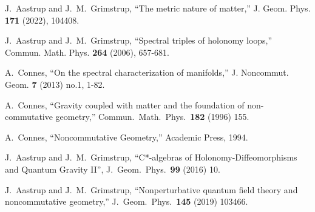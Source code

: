 \documentclass[letterpaper,12pt]{article}
\begin{document}
\begin{thebibliography}{99}




J.~Aastrup and J.~M.~Grimstrup,
``The metric nature of matter,''
J. Geom. Phys. \textbf{171} (2022), 104408.


J.~Aastrup and J.~M.~Grimstrup,
``Spectral triples of holonomy loops,''
Commun. Math. Phys. \textbf{264} (2006), 657-681.




A.~Connes,
``On the spectral characterization of manifolds,''
J. Noncommut. Geom. \textbf{7} (2013) no.1, 1-82.




A.~Connes,
``Gravity coupled with matter and the foundation of non-commutative
geometry,''
Commun.\ Math.\ Phys.\  {\bf 182} (1996) 155.





A.~Connes,
``Noncommutative Geometry,'' Academic Press, 1994.







  J.~Aastrup and J.~M.~Grimstrup,
  ``C*-algebras of Holonomy-Diffeomorphisms and Quantum Gravity II'',
   J.\ Geom.\ Phys.\  {\bf 99} (2016) 10.






  J.~Aastrup and J.~M.~Grimstrup,
  ``Nonperturbative quantum field theory and noncommutative geometry,''
  J.\ Geom.\ Phys.\  {\bf 145} (2019) 103466.




\end{thebibliography}
\end{document}
